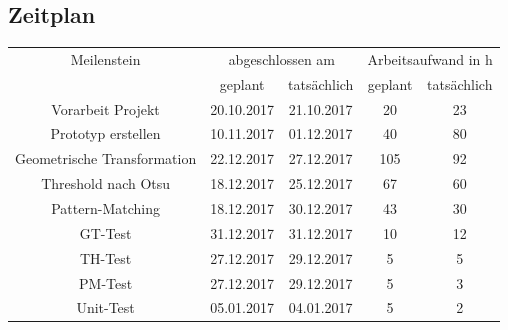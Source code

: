 \documentclass[paper=A4, deutsch]{scrartcl}
\begin{document}
\subsection{Zeitplan}
\begin{table}[h!]
	\centering
		\begin{tabular}{|c|c|c|c|c|}
		\hline
		Meilenstein & \multicolumn{2}{c|}{abgeschlossen am} & \multicolumn{2}{c|}{Arbeitsaufwand in h}\\
		\cline{2-5}
		 & geplant & tatsächlich & geplant & tatsächlich\\
		\hline
		Vorarbeit Projekt& 20.10.2017 & 21.10.2017 & 20 & 23\\
		Prototyp erstellen& 10.11.2017& 01.12.2017 & 40 & 80\\
		Geometrische Transformation& 22.12.2017& 27.12.2017 & 105  & 92 \\
		Threshold nach Otsu& 18.12.2017& 25.12.2017 & 67 & 60 \\
		Pattern-Matching & 18.12.2017 &30.12.2017 & 43 & 30\\
		GT-Test & 31.12.2017& 31.12.2017 & 10  & 12 \\
		TH-Test & 27.12.2017 & 29.12.2017 & 5 & 5 \\
		PM-Test & 27.12.2017& 29.12.2017 & 5 & 3 \\
		Unit-Test & 05.01.2017& 04.01.2017 & 5 & 2 \\
		\hline
		\end{tabular}
\end{table}


 \newpage
\end{document}
